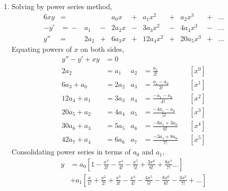 \begin{enumerate}
    \item Solving by power series method,
          \begin{alignat}{6}
              xy    & ={}       &       & {}        & a_0 x  &
              {}+{} & a_1 x^2   & {}+{} & a_2x^3    & {}+{}  & \dots \\
              -y'   & ={}-{}    & a_1   & {}-{}     & 2a_2 x &
              {}-{} & 3a_3 x^2  & {}-{} & 4a_4 x^3  & {}-{}  & \dots \\
              y''   & ={}       & 2a_2  & {}+{}     & 6a_3 x &
              {}+{} & 12a_4 x^2 & {}+{} & 20a_5 x^3 & {}+{}  & \dots
          \end{alignat}
          Equating powers of $ x $ on both sides,
          \begin{align}
              y'' - y' + xy & = 0                                   \\
              2a_2          & = a_1                     &
              a_2           & = \frac{a_1}{2!}          &   & [x^0] \\
              6a_3 + a_0    & = 2a_2                    &
              a_3           & = \frac{a_1 - a_0}{3!}    &   & [x^1] \\
              12a_4 + a_1   & = 3a_3                    &
              a_4           & = \frac{-a_1 - a_0}{4!}   &   & [x^2] \\
              20a_5 + a_2   & = 4a_4                    &
              a_5           & = \frac{-4a_1 - a_0}{5!}  &   & [x^3] \\
              30a_6 + a_3   & = 5a_5                    &
              a_6           & = \frac{-8a_1 + 3a_0}{6!} &   & [x^4] \\
              42a_7 + a_4   & = 6a_6                    &
              a_7           & = \frac{-3a_1 + 8a_0}{7!} &   & [x^5]
          \end{align}
          Consolidating power series in terms of $ a_0 $ and $ a_1 $,
          \begin{align}
              y & = a_0\left[ 1 - \frac{x^3}{3!} - \frac{x^4}{4!}
              - \frac{x^5}{5!} + \frac{3x^6}{6!} + \frac{8x^7}{7!} \dots \right] \\
                & + a_1 \left[ \frac{x}{1!} + \frac{x^2}{2!}
                  + \frac{x^3}{3!} - \frac{x^4}{4!} - \frac{4x^5}{5!}
                  - \frac{8x^6}{6!} - \frac{3x^7}{7!} + \dots \right]
          \end{align}


\end{enumerate}
